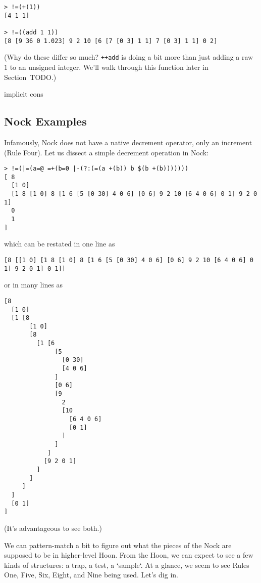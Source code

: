 \begin{lstlisting}[style=nonumbers]
> !=(+(1))
[4 1 1]

> !=((add 1 1))
[8 [9 36 0 1.023] 9 2 10 [6 [7 [0 3] 1 1] 7 [0 3] 1 1] 0 2]
\end{lstlisting}

(Why do these differ so much?  \texttt{++add} is doing a bit more than just adding a raw $1$ to an unsigned integer.  We'll walk through this function later in Section~TODO.)

implicit cons

\subsection{Nock Examples}

Infamously, Nock does not have a native decrement operator, only an increment (Rule Four).  Let us dissect a simple decrement operation in Nock:

\begin{lstlisting}[style=nonumbers]
> !=(|=(a=@ =+(b=0 |-(?:(=(a +(b)) b $(b +(b)))))))
[ 8
  [1 0]
  [1 8 [1 0] 8 [1 6 [5 [0 30] 4 0 6] [0 6] 9 2 10 [6 4 0 6] 0 1] 9 2 0 1]
  0
  1
]
\end{lstlisting}

which can be restated in one line as

\begin{lstlisting}[style=nonumbers]
[8 [[1 0] [1 8 [1 0] 8 [1 6 [5 [0 30] 4 0 6] [0 6] 9 2 10 [6 4 0 6] 0 1] 9 2 0 1] 0 1]]
\end{lstlisting}

or in many lines as

\begin{lstlisting}[style=numbers]
[8
  [1 0]
  [1 [8
       [1 0]
       [8
         [1 [6
              [5
                [0 30]
                [4 0 6]
              ]
              [0 6]
              [9
                2
                [10
                  [6 4 0 6]
                  [0 1]
                ]
              ]
            ]
           [9 2 0 1]
         ]
       ]
     ]
  ]
  [0 1]
]
\end{lstlisting}

(It's advantageous to see both.)

We can pattern-match a bit to figure out what the pieces of the Nock are supposed to be in higher-level Hoon.  From the Hoon, we can expect to see a few kinds of structures:  a trap, a test, a `sample`.  At a glance, we seem to see Rules One, Five, Six, Eight, and Nine being used.  Let's dig in.

